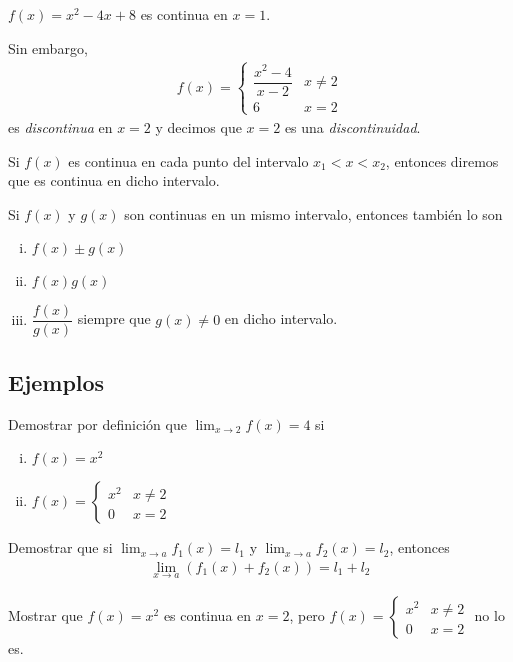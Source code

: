   \begin{resuelto}
   $f(x)=x^{2}-4x+8$ es continua en $x=1$.
  \end{resuelto}


  \begin{resuelto}
   Sin embargo,
   \begin{align*}
   f(x)=
    \begin{cases}
\dfrac{x^2-4}{x-2}& x\neq 2\\
6 & x= 2
\end{cases}
    \end{align*}
    es \emph{discontinua} en $x=2$  y decimos que $x=2$ es una \emph{discontinuidad}.
  \end{resuelto}


{}
  Si $f(x)$ es continua en cada punto del intervalo $x_{1}<x<x_{2}$, entonces diremos que es continua en dicho intervalo.

{}
  \begin{proposicion}
   Si $f(x)$ y $g(x)$ son continuas en un mismo intervalo, entonces también lo son
   \begin{enumerate}[(i)]
     \item $f(x)\pm g(x)$

     \item $f(x)g(x)$

     \item $\dfrac{f(x)}{g(x)}$ siempre que $g(x)\neq 0$ en dicho intervalo.
\end{enumerate}
  \end{proposicion}


\subsection{Ejemplos}
{}
  \begin{resuelto}
   Demostrar por definición que $\lim_{x\to 2}f(x)=4$ si
   \begin{enumerate}[(i)]
     \item $f(x)=x^{2}$

     \item $f(x)= \begin{cases}
x^{2} & x\neq 2 \\
0 & x =2
\end{cases}$
\end{enumerate}
  \end{resuelto}


{}
  \begin{resuelto}
  Demostrar que si $\lim_{x\to a}f_{1}(x)=l_{1}$ y $\lim_{x\to a}f_{2}(x)=l_{2}$, entonces
  \begin{align*}
   \lim_{x\to a}\left( f_{1}(x)+f_{2}(x) \right)=l_{1}+l_{2}
   \end{align*}
  \end{resuelto}


{}
  \begin{resuelto}
   Mostrar que $f(x)=x^{2}$ es continua en $x=2$, pero $f(x)= \begin{cases}
x^{2} & x\neq 2 \\
0 & x =2
\end{cases}$ no lo es.
  \end{resuelto}


